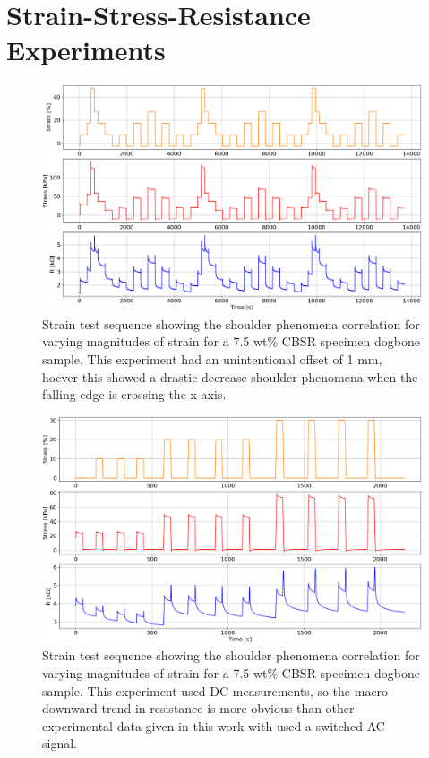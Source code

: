 \chapter{Strain-Stress-Resistance Experiments}
\label{appendix-B}
\begin{figure}[H]
	\centering
	\includegraphics[width=\linewidth]{Figures/2_7-5_E4pin_20mm_v12_0.1_0.2_0.3_strain_1mm_offset_erroneous.png}
	\caption{Strain test sequence showing the shoulder phenomena correlation for varying magnitudes of strain for a 7.5 wt\% CBSR specimen dogbone sample. This experiment had an unintentional offset of 1 mm, hoever this showed a drastic decrease shoulder phenomena when the falling edge is crossing the x-axis.}
	\label{fig:strain-hill}
\end{figure}
\begin{figure}[H]
	\centering
	\includegraphics[width=\linewidth]{Figures/1_7-5_Epin_20mm_v2_DC_meas_3_strains.png}
	\caption{Strain test sequence showing the shoulder phenomena correlation for varying magnitudes of strain for a 7.5 wt\% CBSR specimen dogbone sample. This experiment used DC measurements, so the macro downward trend in resistance is more obvious than other experimental data given in this work with used a switched AC signal.}
	\label{fig:strain-train-DC-meas}
\end{figure}

